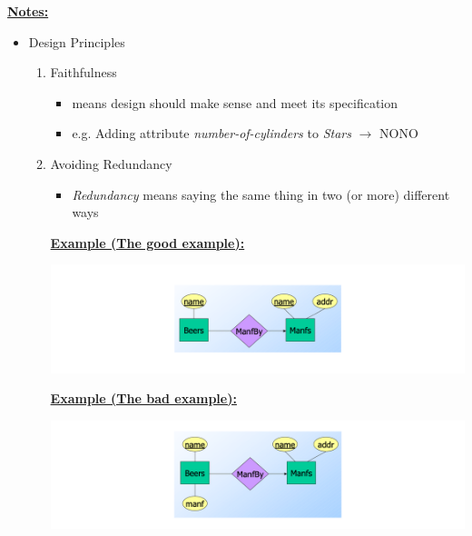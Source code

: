 \documentclass[12pt]{article}
\begin{document}
\begin{enumerate}[1.]
    \bigskip

    \underline{\textbf{Notes:}}

    \bigskip

    \begin{itemize}
        \item Design Principles

        \begin{enumerate}[1.]
            \item Faithfulness

            \begin{itemize}
                \item means design should make sense and meet its specification
                \item e.g. Adding attribute \textit{number-of-cylinders} to \textit{Stars} $\to$ NONO
            \end{itemize}

            \item Avoiding Redundancy

            \begin{itemize}
                \item \textit{Redundancy} means saying the same thing in
                two (or more) different ways
            \end{itemize}

            \bigskip

            \underline{\textbf{Example (The good example):}}

            \bigskip

            \begin{center}
            \includegraphics[width=\linewidth]{images/worksheet_14_solution_36.png}
            \end{center}

            \bigskip

            \underline{\textbf{Example (The bad example):}}

            \bigskip

            \begin{center}
            \includegraphics[width=\linewidth]{images/worksheet_14_solution_37.png}
            \end{center}


\end{enumerate}
\end{itemize}
\end{enumerate}
\end{document}
